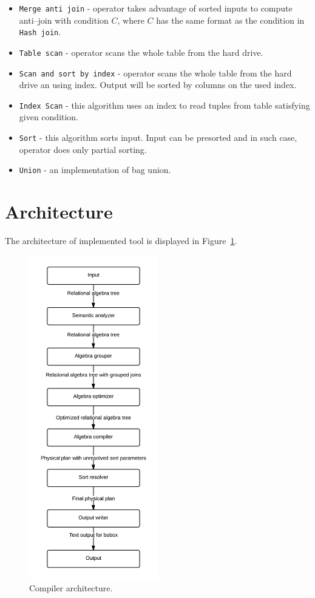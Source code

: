 \begin{itemize}
\item \texttt{Merge~anti~join} - operator takes advantage of sorted inputs to compute anti--join with condition $C$, where $C$ has the same format as the condition in \texttt{Hash~join}. 
\item \texttt{Table~scan} - operator scans the whole table from the hard drive.
\item \texttt{Scan~and~sort~by~index} - operator scans the whole table from the hard drive an using index. Output will be sorted by columns on the used index.
\item \texttt{Index~Scan} - this algorithm uses an index to read tuples from table satisfying given condition.
\item \texttt{Sort} - this algorithm sorts input. Input can be presorted and in such case, operator does only partial sorting.
\item \texttt{Union} - an implementation of bag union.

\end{itemize}


\section{Architecture}
The architecture of implemented tool is displayed in Figure~\ref{fig:compilerarchitecture}.

\begin{figure}[h!]
  \centering
    \includegraphics[width=0.5\textwidth]{compilerarchitecture}

      \caption{Compiler architecture.}
          \label{fig:compilerarchitecture}
\end{figure}

